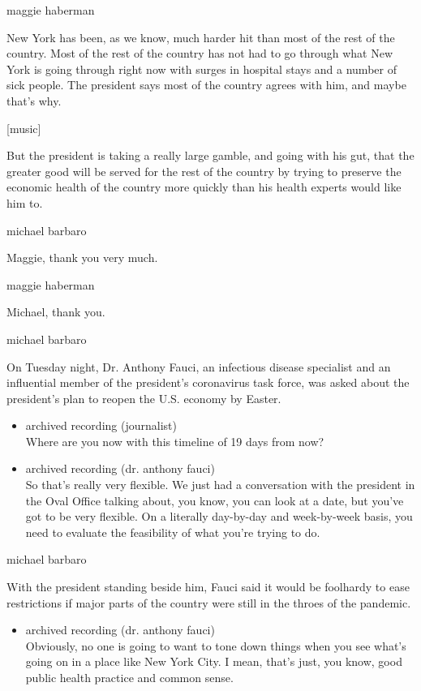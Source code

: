 maggie haberman

New York has been, as we know, much harder hit than most of the rest of
the country. Most of the rest of the country has not had to go through
what New York is going through right now with surges in hospital stays
and a number of sick people. The president says most of the country
agrees with him, and maybe that's why.

{[}music{]}

But the president is taking a really large gamble, and going with his
gut, that the greater good will be served for the rest of the country by
trying to preserve the economic health of the country more quickly than
his health experts would like him to.

michael barbaro

Maggie, thank you very much.

maggie haberman

Michael, thank you.

michael barbaro

On Tuesday night, Dr. Anthony Fauci, an infectious disease specialist
and an influential member of the president's coronavirus task force, was
asked about the president's plan to reopen the U.S. economy by Easter.

\begin{itemize}
\item
  archived recording (journalist)\\
  Where are you now with this timeline of 19 days from now?
\item
  archived recording (dr. anthony fauci)\\
  So that's really very flexible. We just had a conversation with the
  president in the Oval Office talking about, you know, you can look at
  a date, but you've got to be very flexible. On a literally day-by-day
  and week-by-week basis, you need to evaluate the feasibility of what
  you're trying to do.
\end{itemize}

michael barbaro

With the president standing beside him, Fauci said it would be foolhardy
to ease restrictions if major parts of the country were still in the
throes of the pandemic.

\begin{itemize}
\tightlist
\item
  archived recording (dr. anthony fauci)\\
  Obviously, no one is going to want to tone down things when you see
  what's going on in a place like New York City. I mean, that's just,
  you know, good public health practice and common sense.
\end{itemize}

